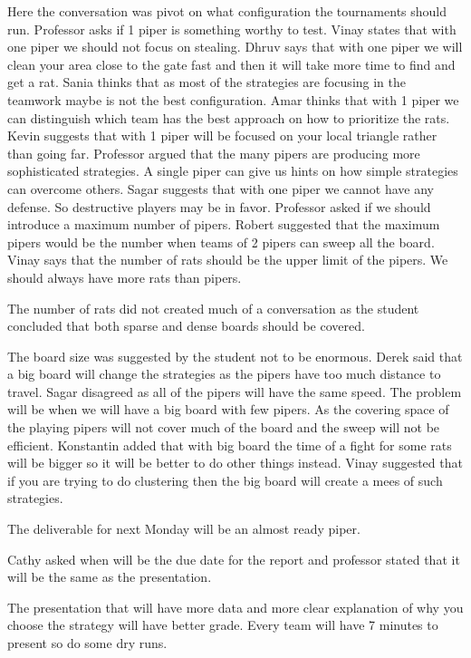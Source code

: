 Here the conversation was pivot on what configuration the tournaments should run.
Professor asks if 1 piper is something worthy to test.
Vinay states that with one piper we should not focus on stealing.
Dhruv says that with one piper we will clean your area close to the gate fast and 
then it will take more time to find and get a rat.
Sania thinks that as most of the strategies are focusing in the teamwork maybe is not the best configuration. 
Amar thinks that with 1 piper we can distinguish which team has the best approach on how to prioritize the rats.
Kevin suggests that with 1 piper will be focused on your local triangle rather than going far.
Professor argued that the many pipers are producing more sophisticated strategies. 
A single piper can give us hints on how simple strategies can overcome others.
Sagar suggests that with one piper we cannot have any defense. So destructive 
players may be in favor.
Professor asked if we should introduce a maximum number of pipers.
Robert suggested that the maximum pipers would be the number when teams of 2 pipers 
can sweep all the board.
Vinay says that the number of rats should be the upper limit of the pipers. We 
should always have more rats than pipers.

The number of rats did not created much of a conversation as the student concluded 
that both sparse and dense boards should be covered.

The board size was suggested by the student not to be enormous.
Derek said that a big board will change the strategies as the pipers have too 
much distance to travel.
Sagar disagreed as all of the pipers will have the same speed. The problem will 
be when we will have a big board with few pipers. As the covering space of the 
playing pipers will not cover much of the board and the sweep will not be efficient.
Konstantin added that with big board the time of a fight for some rats will be 
bigger so it will be better to do other things instead.
Vinay suggested that if you are trying to do clustering then the big board will 
create a mees of such strategies.

The deliverable for next Monday will be an almost ready piper.

Cathy asked when will be the due date for the report and professor stated that 
it will be the same as the presentation. 

The presentation that will have more data and more clear explanation of why you 
choose the strategy will have better grade.
Every team will have 7 minutes to present so do some dry runs.


